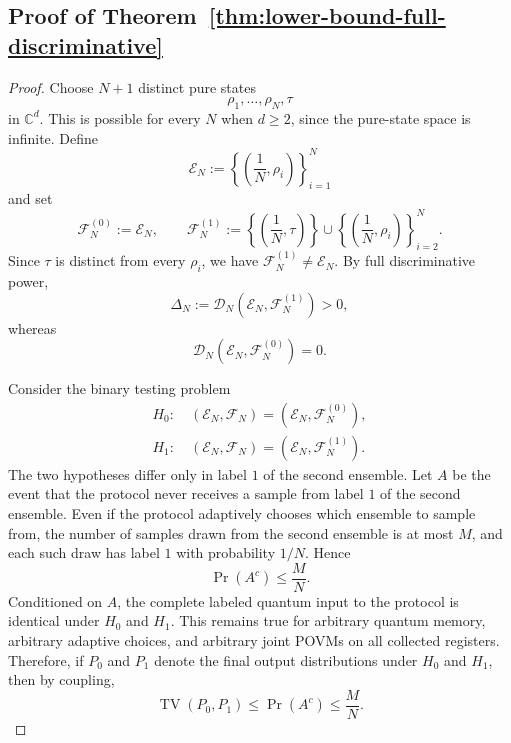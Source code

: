 \documentclass[aps,prx,reprint,superscriptaddress,amsmath,amssymb,longbibliography,floatfix]{revtex4-2}
\newcommand{\scD}{\mathcal{D}}
\theoremstyle{plain}
\theoremstyle{definition}
\theoremstyle{remark}
\begin{document}
\subsection{Proof of Theorem~\ref{thm:lower-bound-full-discriminative}}\label{app:lower-bound-full-discriminative}

\begin{proof}
Choose \(N+1\) distinct pure states
\[
    \rho_1,\ldots,\rho_N,\tau
\]
in \(\mathbb C^d\). This is possible for every \(N\) when \(d\ge 2\), since the pure-state space is
infinite. Define
\[
    \mathcal E_N
    :=
    \left\{\left(\frac1N,\rho_i\right)\right\}_{i=1}^N
\]
and set
\begin{equation}
    \mathcal F_N^{(0)}
    :=
    \mathcal E_N,
    \qquad
    \mathcal F_N^{(1)}
    :=
    \left\{\left(\frac1N,\tau\right)\right\}
    \cup
    \left\{\left(\frac1N,\rho_i\right)\right\}_{i=2}^N .
\label{eq:app-full-discrimination-hard-ensembles}
\end{equation}
Since \(\tau\) is distinct from every \(\rho_i\), we have
\(\mathcal F_N^{(1)}\neq \mathcal E_N\). By full discriminative power,
\begin{equation}
    \Delta_N
    :=
    \scD_N(\mathcal E_N,\mathcal F_N^{(1)})
    >
    0,
\label{eq:app-full-discrimination-instance-gap}
\end{equation}
whereas
\[
    \scD_N(\mathcal E_N,\mathcal F_N^{(0)})=0.
\]

Consider the binary testing problem
\[
\begin{gathered}
H_0:\quad (\mathcal E_N,\mathcal F_N)=(\mathcal E_N,\mathcal F_N^{(0)}),
    \\
    H_1:\quad (\mathcal E_N,\mathcal F_N)=(\mathcal E_N,\mathcal F_N^{(1)}).
\end{gathered}
\]
The two hypotheses differ only in label \(1\) of the second ensemble. Let \(A\) be the event that the
protocol never receives a sample from label \(1\) of the second ensemble. Even if the protocol
adaptively chooses which ensemble to sample from, the number of samples drawn from the second
ensemble is at most \(M\), and each such draw has label \(1\) with probability \(1/N\). Hence
\[
    \Pr(A^c)\le \frac{M}{N}.
\]
Conditioned on \(A\), the complete labeled quantum input to the protocol is identical under
\(H_0\) and \(H_1\). This remains true for arbitrary quantum memory, arbitrary adaptive choices,
and arbitrary joint POVMs on all collected registers. Therefore, if \(P_0\) and \(P_1\) denote the
final output distributions under \(H_0\) and \(H_1\), then by coupling,
\begin{equation}
    \operatorname{TV}(P_0,P_1)\le \Pr(A^c)\le \frac{M}{N}.
\label{eq:app-full-discrimination-tv-bound}
\end{equation}


\end{proof}
\end{document}
